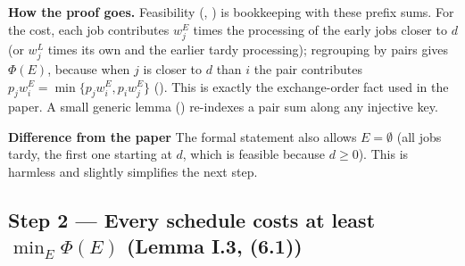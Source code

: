 \documentclass[11pt]{article}
\newcommand{\notelabel}[1]{{\sffamily\bfseries\small\color{noterule}#1}\quad}
\begin{document}
\textbf{How the proof goes.} Feasibility (, ) is
bookkeeping with these prefix sums. For the cost, each job contributes $w^E_j$ times the
processing of the early jobs closer to $d$ (or $w^L_j$ times its own and the earlier tardy
processing); regrouping by pairs gives $\Phi(E)$, because when $j$ is closer to $d$ than $i$
the pair contributes $p_jw^E_i=\min\{p_jw^E_i,p_iw^E_j\}$ (). This is
exactly the exchange-order fact used in the paper. A small generic lemma
() re-indexes a pair sum along any injective key.

\begin{notebox}
\notelabel{Difference from the paper}
The formal statement also allows $E=\emptyset$ (all jobs tardy, the first one starting at $d$,
which is feasible because $d\ge 0$). This is harmless and slightly simplifies the next step.
\end{notebox}

\subsection{Step 2 --- Every schedule costs at least \texorpdfstring{$\min_E\Phi(E)$}{min Phi(E)} (Lemma I.3, (6.1))}\label{step:lower}
\end{document}
